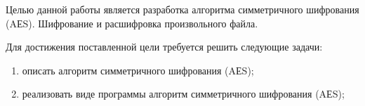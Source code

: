 
Целью данной работы является разработка алгоритма симметричного шифрования (AЕS). Шифрование и расшифровка произвольного файла.

Для достижения поставленной цели требуется решить следующие задачи:
\begin{enumerate}[label={\arabic*)}]
	\item описать алгоритм симметричного шифрования (AЕS);
	\item реализовать виде программы алгоритм симметричного шифрования (AЕS);
\end{enumerate}


\clearpage
